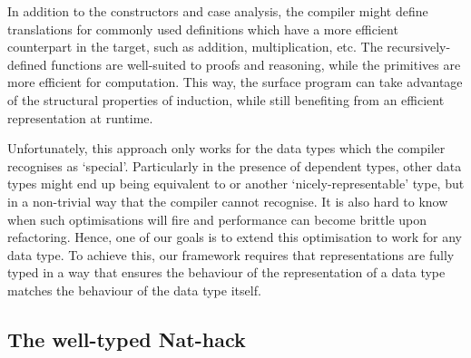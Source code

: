 In addition to the constructors and case analysis, the compiler might define
translations for commonly used definitions which have a more efficient
counterpart in the target, such as addition, multiplication,
etc. The recursively-defined functions are well-suited to proofs and reasoning,
while the primitives are more efficient for computation. This way, the surface
program can take advantage of the structural properties of induction,
while still benefiting from an efficient representation at runtime.

Unfortunately, this approach only works for the data types which the
compiler recognises as `special'. Particularly in the presence of dependent
types, other data types might end up being equivalent to  or
another `nicely-representable' type, but in a non-trivial way that the compiler
cannot recognise. It is also hard to know when such optimisations will fire
and performance can become brittle upon refactoring.
Hence, one of our goals is to extend this optimisation to work
for any data type. To achieve this, our framework requires that
representations are fully typed in a way that ensures the behaviour of the
representation of a data type matches the behaviour of the data type itself.

\subsection{The well-typed Nat-hack}

